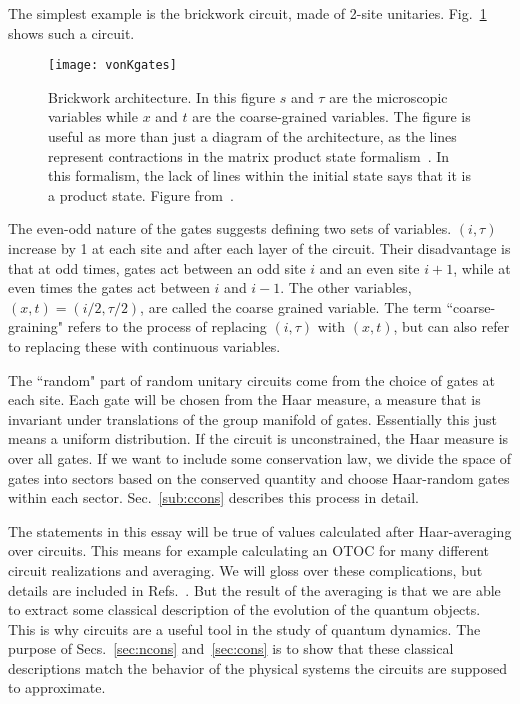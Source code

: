 \documentclass[a4paper,11pt]{article}
\renewcommand{\t}{\tau}
\begin{document}
The simplest example is the brickwork circuit, made of 2-site unitaries. Fig.~\ref{fig:vonKgates} shows such a circuit.
\begin{figure}
	\centering
	\texttt{[image: vonKgates]}
	\caption{Brickwork architecture. In this figure $s$ and $\tau$ are the microscopic variables while $x$ and $t$ are the coarse-grained variables. The figure is useful as more than just a diagram of the architecture, as the lines represent contractions in the matrix product state formalism~\cite{PerezMPS, SchollwockDMRG}. In this formalism, the lack of lines within the initial state says that it is a product state. Figure from~\cite{vonKeyserlingkHydro}.}
	\label{fig:vonKgates}
\end{figure}
The even-odd nature of the gates suggests defining two sets of variables. $(i,\t)$ increase by 1 at each site and after each layer of the circuit. 
Their disadvantage is that at odd times, gates act between an odd site $i$ and an even site $i+1$, while at even times the gates act between $i$ and $i-1$.
The other variables, $(x,t) = (i/2,\t/2)$, are called the coarse grained variable.
The term ``coarse-graining" refers to the process of replacing $(i,\t)$ with $(x,t)$, but can also refer to replacing these with continuous variables.

The ``random" part of random unitary circuits come from the choice of gates at each site. Each gate will be chosen from the Haar measure, a measure that is invariant under translations of the group manifold of gates. Essentially this just means a uniform distribution. If the circuit is unconstrained, the Haar measure is over all gates. If we want to include some conservation law, we divide the space of gates into sectors based on the conserved quantity and choose Haar-random gates within each sector. Sec.~\ref{sub:ccons} describes this process in detail.

The statements in this essay will be true of values calculated after Haar-averaging over circuits. This means for example calculating an OTOC for many different circuit realizations and averaging. We will gloss over these complications, but details are included in Refs.~\cite{ChenOtoc, ZhangFloq, vonKeyserlingkHydro, NahumOpSp, KhemaniOpSp}. But the result of the averaging is that we are able to extract some classical description of the evolution of the quantum objects. This is why circuits are a useful tool in the study of quantum dynamics. The purpose of Secs.~\ref{sec:ncons} and~\ref{sec:cons} is to show that these classical descriptions match the behavior of the physical systems the circuits are supposed to approximate.
\end{document}

